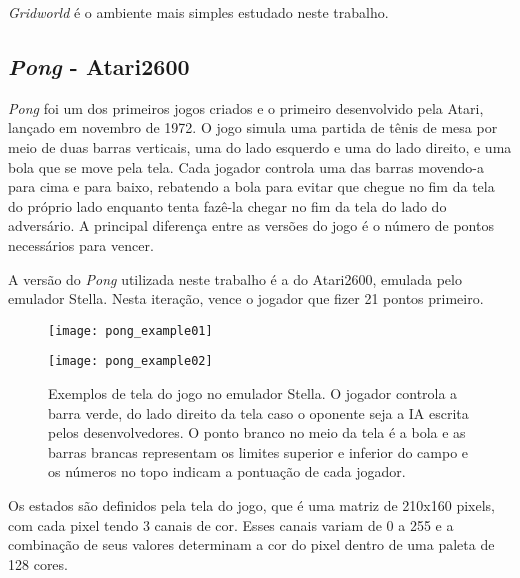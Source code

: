 \textit{Gridworld} é o ambiente mais simples estudado neste trabalho.

\subsection{\textit{Pong} - Atari2600}
\label{sec:pong}

\textit{Pong} foi um dos primeiros jogos criados e o primeiro desenvolvido pela Atari, lançado em novembro de 1972.
O jogo simula uma partida de tênis de mesa por meio de duas barras verticais, uma do lado esquerdo e uma do lado direito, e uma bola que se move pela tela.
Cada jogador controla uma das barras movendo-a para cima e para baixo, rebatendo a bola para evitar que chegue no fim da tela do próprio lado enquanto tenta fazê-la chegar no fim da tela do lado do adversário.
A principal diferença entre as versões do jogo é o número de pontos necessários para vencer.

A versão do \textit{Pong} utilizada neste trabalho é a do Atari2600, emulada pelo emulador Stella.
Nesta iteração, vence o jogador que fizer 21 pontos primeiro.

\begin{figure}[h!]
  \begin{minipage}[b]{.5\textwidth}
  \centering
  \texttt{[image: pong\_example01]}
  \end{minipage}
  \hfill
  \begin{minipage}[b]{.5\textwidth}
  \texttt{[image: pong\_example02]}
  \end{minipage}
  \caption{Exemplos de tela do jogo no emulador Stella. O jogador controla a barra verde, do lado direito da tela caso o oponente seja a IA escrita pelos desenvolvedores. O ponto branco no meio da tela é a bola e as barras brancas representam os limites superior e inferior do campo e os números no topo indicam a pontuação de cada jogador.}
\end{figure}

Os estados são definidos pela tela do jogo, que é uma matriz de 210x160 pixels, com cada pixel tendo 3 canais de cor.
Esses canais variam de 0 a 255 e a combinação de seus valores determinam a cor do pixel dentro de uma paleta de 128 cores.

